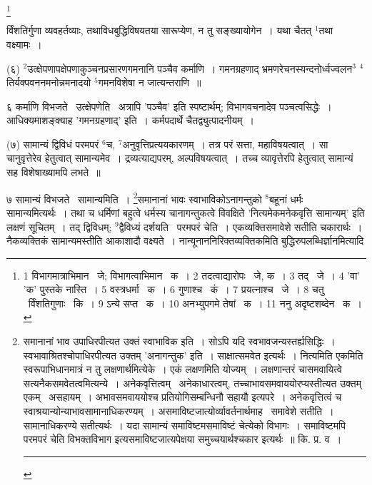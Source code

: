 \documentclass[11pt, openany]{book}
\newcommand\blfootnote[1]{%
 \begingroup
 \renewcommand\thefootnote{}\footnote{#1}%
 \addtocounter{footnote}{-1}%
 \endgroup
}
\begin{document}
\blfootnote{1 विभागमात्राभिमान  \textendash\ जे; विभागत्वाभिमान  \textendash\ क~। 2 तदत्वाद्यारोपः  \textendash\ जे, क~। 3 तद्  \textendash\ जे~। 4 'वा' 'क' पुस्तके नास्ति~। 5 वस्त्रधर्मा \textendash\ क~। 6 गुणाश्च  \textendash\ कं~। 7 प्रयत्नाश्च  \textendash\ जे~। 8 चतु  \textendash\ र्विंशतिगुणाः  \textendash\ कि~। 9 ऽन्ये सप्त  \textendash\ क~। 10 अनभ्युपगमे तेषां  \textendash\ क~। 11 ननु अदृष्टशब्देन  \textendash\ क~।}

\newpage
\noindent
र्विंशतिर्गुणा व्यवहर्तव्याः, तथाविधबुद्धिविषयतया सारूप्येण, न तु सङ्ख्यायोगेन~। यथा चैतत् ${}^1$तथा वक्ष्यामः~।

\hangindent=2cm {\knu (६) ${}^2$उत्क्षेपणापक्षेपणाकुञ्चनप्रसारणगमनानि पञ्चैव कर्माणि~। गमनग्रहणाद् भ्रमणरेचनस्यन्दनोर्ध्वज्वलन$^3$ ${}^4$तिर्यक्पवननमनोन्नमनादयो ${}^5$गमनविशेषा न जात्यन्तराणि~॥}

६ कर्माणि विभजते \textendash\ उत्क्षेपणेति \textendash\ अत्रापि 'पञ्चैव' इति स्पष्टार्थम्; विभागवचनादेव पञ्चत्वसिद्धेः~। आधिक्यमाशङ्क्याह {\knu 'गमनग्रहणाद्'} इति~। कर्मपदार्थे चैतद्व्युत्पादनीयम्~।

\hangindent=2cm {\knu (७) सामान्यं द्विविधं परमपरं ${}^6$च, ${}^7$अनुवृत्तिप्रत्ययकारणम्~। तत्र परं सत्ता, महाविषयत्वात्~। सा चानुवृत्तेरेव हेतुत्वात् सामान्यमेव~। द्रव्यत्याद्यपरम्, अल्पविषयत्वात्~। तच्च व्यावृत्तेरपि हेतुत्वात् सामान्यं सह विशेषाख्यामपि लभते~॥}

७ सामान्यं विभजते \textendash\ {\knu सामान्यमिति}~। \renewcommand{\thefootnote}{१}\footnote{समानानां भाव उपाधिरपीत्यत उक्तं स्वाभाविक इति~। सोऽपि यदि स्वभावजन्यस्तर्ह्यसिद्धिः~। स्वभावाश्रितश्चोपाधिरपीत्यत उक्तम् 'अनागन्तुक' इति~। साक्षात्समवेत इत्यर्थः~। नित्यमिति एकमिति स्वरूपाभिधानमात्रं न तु लक्षणार्थमित्येके~। एकं लक्षणमिति योज्यम्~। लक्षणान्तरं चासमवायित्वे सत्यनैकसमवेतत्वमित्यन्ये~। अनेकवृत्तित्वम् \textendash\ अनेकाधारत्वम्, तच्चाभावसमवाययोरप्यस्तीत्यत उक्तम् एकम् \textendash\ असहायम्~। अभावसमवाययोश्च प्रतियोगिसम्बन्धिनौ सहायौ इत्यपरे~। अनेकवृत्तित्वं च स्वाश्रयान्योन्याभावसामानाधिकरण्यम्~। असमाविष्टजात्योर्व्यावर्तनार्थमाह \textendash\ समावेशे सतीति~। सामानाधिकरण्ये सतीत्यर्थः~। यदा सामान्यं समाविष्टमसमाविष्टं चेत्येको विभागः~। समाविष्टमपि परमपरं चेति विभक्तविभाग इत्यसमाविष्टजात्यपेक्षया समुच्चयार्थश्चकार इत्यर्थः~॥ कि. प्र. व~। \rule{0.4\linewidth}{0.5pt}}समानानां भावः स्वाभाविकोऽनागन्तुको ${}^8$बहूनां धर्मः सामान्यमित्यर्थः~। तथा च धर्मिणां बहुत्वे धर्मस्य चानागन्तुकत्वे विवक्षिते 'नित्यमेकमनेकवृत्ति सामान्यम्' इति लक्षणं सूचितम्~। तद् द्विविधम्; ${}^9$द्वैविध्यं दर्शयति \textendash\ {\knu परमपरं चेति}~। एकव्यक्तिसमावेशे सतीति चकारार्थः~। नैकव्यक्तिकं सामान्यमस्तीति आकाशादौ वक्ष्यते~। नान्यूनाननिरिक्तव्यक्तिकमिति बुद्धिरुपलब्धिर्ज्ञानमित्यादि\textendash
\end{document}
